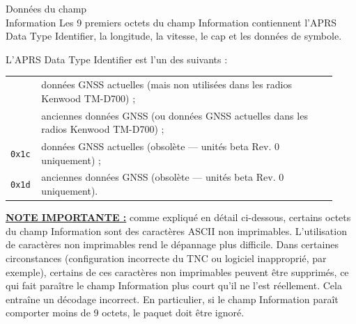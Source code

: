 \begin{aprssideblock}{Données du champ\\Information}
Les 9 premiers octets du champ Information contiennent l'APRS Data Type
Identifier, la longitude, la vitesse, le cap et les données de symbole.

L'APRS Data Type Identifier est l'un des suivants :

\begin{tabular}[t]{@{}>{\ttfamily}p{0.07\linewidth}p{0.86\linewidth}@{}}
\lit{`} & données GNSS actuelles (mais non utilisées dans les radios Kenwood
TM-D700) ; \\
\lit{'} & anciennes données GNSS (ou données GNSS actuelles dans les radios
Kenwood TM-D700) ; \\
\texttt{0x1c} & données GNSS actuelles (obsolète --- unités beta Rev. 0
uniquement) ; \\
\texttt{0x1d} & anciennes données GNSS (obsolète --- unités beta Rev. 0
uniquement).
\end{tabular}

\textbf{\underline{NOTE IMPORTANTE :}} comme expliqué en détail ci-dessous, certains
octets du champ Information sont des caractères ASCII non imprimables.
L'utilisation de caractères non imprimables rend le dépannage plus difficile.
Dans certaines circonstances (configuration incorrecte du TNC ou logiciel
inapproprié, par exemple), certains de ces caractères non imprimables peuvent
être supprimés, ce qui fait paraître le champ Information plus court qu'il ne
l'est réellement. Cela entraîne un décodage incorrect. En particulier, si le
champ Information paraît comporter moins de 9 octets, le paquet doit être
ignoré.
\end{aprssideblock}

